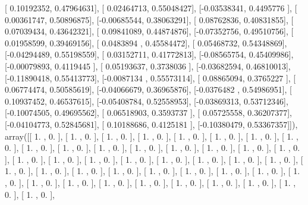 \documentclass{article}
\begin{document}
       [ 0.10192352,  0.47964631],
       [ 0.02464713,  0.55048427],
       [-0.03538341,  0.4495776 ],
       [ 0.00361747,  0.50896875],
       [-0.00685544,  0.38063291],
       [ 0.08762836,  0.40831855],
       [ 0.07039434,  0.43642321],
       [ 0.09841089,  0.44874876],
       [-0.07352756,  0.49510756],
       [ 0.01958599,  0.39469156],
       [ 0.0483894 ,  0.45584472],
       [ 0.05468732,  0.54348869],
       [-0.04294489,  0.55198559],
       [ 0.03152711,  0.41772813],
       [-0.08565754,  0.45409986],
       [-0.00079893,  0.4119445 ],
       [ 0.05193637,  0.3738036 ],
       [-0.03682594,  0.46810013],
       [-0.11890418,  0.55413773],
       [-0.0087134 ,  0.55573114],
       [ 0.08865094,  0.3765227 ],
       [ 0.06774474,  0.50585619],
       [-0.04066679,  0.36965876],
       [-0.0376482 ,  0.54986951],
       [ 0.10937452,  0.46537615],
       [-0.05408784,  0.52558953],
       [-0.03869313,  0.53712346],
       [-0.10074505,  0.49695562],
       [ 0.06518903,  0.3593737 ],
       [ 0.05725558,  0.36207377],
       [-0.04104773,  0.52845681],
       [ 0.10188686,  0.4125181 ],
       [-0.10380479,  0.53367357]]), array([[ 1.        ,  0.        ],
       [ 1.        ,  0.        ],
       [ 1.        ,  0.        ],
       [ 1.        ,  0.        ],
       [ 1.        ,  0.        ],
       [ 1.        ,  0.        ],
       [ 1.        ,  0.        ],
       [ 1.        ,  0.        ],
       [ 1.        ,  0.        ],
       [ 1.        ,  0.        ],
       [ 1.        ,  0.        ],
       [ 1.        ,  0.        ],
       [ 1.        ,  0.        ],
       [ 1.        ,  0.        ],
       [ 1.        ,  0.        ],
       [ 1.        ,  0.        ],
       [ 1.        ,  0.        ],
       [ 1.        ,  0.        ],
       [ 1.        ,  0.        ],
       [ 1.        ,  0.        ],
       [ 1.        ,  0.        ],
       [ 1.        ,  0.        ],
       [ 1.        ,  0.        ],
       [ 1.        ,  0.        ],
       [ 1.        ,  0.        ],
       [ 1.        ,  0.        ],
       [ 1.        ,  0.        ],
       [ 1.        ,  0.        ],
       [ 1.        ,  0.        ],
       [ 1.        ,  0.        ],
       [ 1.        ,  0.        ],
       [ 1.        ,  0.        ],
       [ 1.        ,  0.        ],
       [ 1.        ,  0.        ],
       [ 1.        ,  0.        ],
       [ 1.        ,  0.        ],
       [ 1.        ,  0.        ],
       [ 1.        ,  0.        ],
       [ 1.        ,  0.        ],
       [ 1.        ,  0.        ],
       [ 1.        ,  0.        ],
       [ 1.        ,  0.        ],
\end{document}
